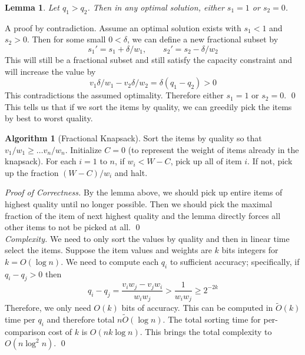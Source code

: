 \documentclass[10pt]{article}
\theoremstyle{plain}
\newtheorem{lem}[thm]{Lemma}
\theoremstyle{definition}
\newtheorem{alg}[thm]{Algorithm}
\numberwithin{equation}{section}
\numberwithin{figure}{section}
\begin{document}
\begin{lem}
Let $q_1 > q_2$. Then in any optimal solution, either $s_1 = 1$ or $s_2 = 0$.
\end{lem}

\proof A proof by contradiction. Assume an optimal solution exists with $s_1 < 1$ and $s_2 > 0$. Then for some small $0 < \delta$, we can define a new fractional subset by
\begin{equation}
s_1' = s_1 + \delta / w_1, \qquad s_2' = s_2 - \delta /w_2
\end{equation}
This will still be a fractional subset and still satisfy the capacity constraint and will increase the value by
\begin{equation}
v_1 \delta / w_1 - v_2 \delta / w_2 = \delta(q_1 - q_2) > 0
\end{equation}
This contradictions the assumed optimality. Therefore either $s_1 = 1$ or $s_2 = 0$. \qed \\

\noindent This tells us that if we sort the items by quality, we can greedily pick the items by best to worst quality. 

\begin{alg}[Fractional Knapsack]
Sort the items by quality so that $v_1 / w_1 \geq \ldots v_n / w_n$. Initialize $C = 0$ (to represent the weight of items already in the knapsack). For each $i = 1$ to $n$, if $w_i < W - C$, pick up all of item $i$. If not, pick up the fraction $(W - C)/w_i$ and halt.
\end{alg}

\noindent \textit{Proof of Correctness. } By the lemma above, we should pick up entire items of highest quality until no longer possible. Then we should pick the maximal fraction of the item of next highest quality and the lemma directly forces all other items to not be picked at all. \qed \\

\noindent \textit{Complexity. } We need to only sort the values by quality and then in linear time select the items. Suppose the item values and weights are $k$ bits integers for $k = O(\log n)$. We need to compute each $q_i$ to sufficient accuracy; specifically, if $q_i - q_j > 0$ then
\begin{equation}
q_i - q_j = \frac{v_i w_j - v_j w_i}{w_iw_j} > \frac{1}{w_iw_j} \geq 2^{-2k}
\end{equation}
Therefore, we only need $O(k)$ bits of accuracy. This can be computed in $\tilde{O}(k)$ time per $q_i$ and therefore total $n \tilde{O}(\log n)$. The total sorting time for per-comparison cost of $k$ is $O(nk \log n)$. This brings the total complexity to $O(n \log^2 n)$. \qed \\
\end{document}
